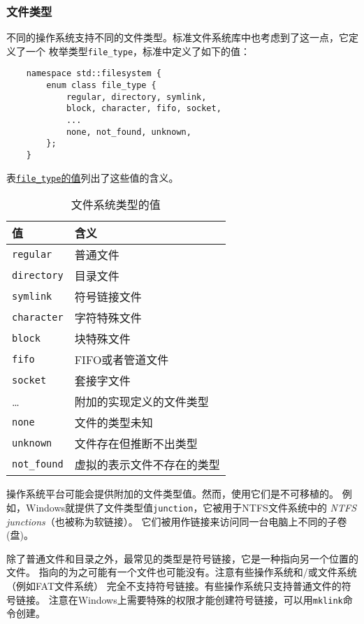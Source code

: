 \subsubsection{文件类型}
不同的操作系统支持不同的文件类型。标准文件系统库中也考虑到了这一点，它定义了一个
枚举类型\texttt{file\_type}，标准中定义了如下的值：
\begin{lstlisting}
    namespace std::filesystem {
        enum class file_type {
            regular, directory, symlink,
            block, character, fifo, socket,
            ...
            none, not_found, unknown,
        };
    }
\end{lstlisting}
表\hyperref[t20.2]{\texttt{file\_type}的值}列出了这些值的含义。
\begin{table}[ht]
    \begin{tabular}{l|p{}}
        \hline
        \textbf{值}          & \textbf{含义}   \\
        \hline
        \texttt{regular}    & 普通文件          \\
        \texttt{directory}  & 目录文件          \\
        \texttt{symlink}    & 符号链接文件        \\
        \texttt{character}  & 字符特殊文件        \\
        \texttt{block}      & 块特殊文件         \\
        \texttt{fifo}       & FIFO或者管道文件    \\
        \texttt{socket}     & 套接字文件         \\
        \ldots              & 附加的实现定义的文件类型  \\
        \texttt{none}       & 文件的类型未知       \\
        \texttt{unknown}    & 文件存在但推断不出类型   \\
        \texttt{not\_found} & 虚拟的表示文件不存在的类型 \\
        \hline
    \end{tabular}
    \caption{文件系统类型的值}
    \label{t20.2}
\end{table}

操作系统平台可能会提供附加的文件类型值。然而，使用它们是不可移植的。
例如，Windows就提供了文件类型值\texttt{junction}，它被用于NTFS文件系统中的
\emph{NTFS junctions}（也被称为软链接）。
它们被用作链接来访问同一台电脑上不同的子卷(盘)。\label{junction}

除了普通文件和目录之外，最常见的类型是符号链接，它是一种指向另一个位置的文件。
指向的为之可能有一个文件也可能没有。注意有些操作系统和/或文件系统（例如FAT文件系统）
完全不支持符号链接。有些操作系统只支持普通文件的符号链接。
注意在Windows上需要特殊的权限才能创建符号链接，可以用\texttt{mklink}命令创建。

